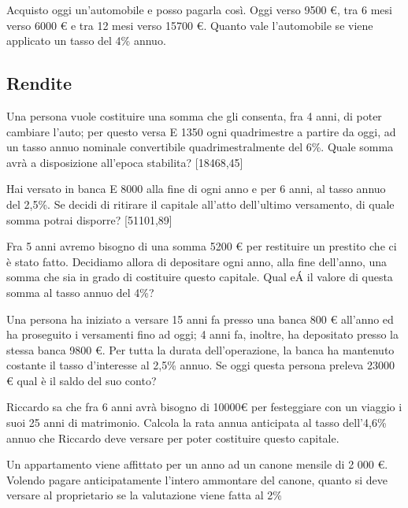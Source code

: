 \begin{esercizio}
Acquisto oggi un'automobile e posso pagarla così. Oggi verso 9500 €, tra 6 mesi verso 6000 € e tra 12 mesi verso 15700 €. Quanto vale l'automobile se viene applicato un tasso del 4\% annuo.
\end{esercizio}


\subsection{Rendite}
\begin{esercizio}
Una persona vuole costituire una somma che gli consenta, fra 4 anni, di poter cambiare l'auto; per questo versa E 1350 ogni quadrimestre a partire da oggi, ad un tasso annuo nominale convertibile quadrimestralmente del 6\%. Quale somma avrà a disposizione all'epoca stabilita?
\hfill[18468,45]
\end{esercizio}
\begin{esercizio}
Hai versato in banca E 8000 alla fine di ogni anno e per 6 anni, al tasso annuo del 2,5\%. Se decidi di
ritirare il capitale all'atto dell'ultimo versamento, di quale somma potrai disporre?
\hfill[51101,89]
\end{esercizio}
\begin{esercizio}
Fra 5 anni avremo bisogno di una somma 5200 € per restituire un prestito che ci è stato fatto. Decidiamo
allora di depositare ogni anno, alla fine dell'anno, una somma che sia in grado di costituire questo capitale. Qual eÁ il valore di questa somma al tasso annuo del 4\%?
\end{esercizio}
\begin{esercizio}
Una persona ha iniziato a versare 15 anni fa presso una banca 800 € all'anno ed ha proseguito i versamenti fino ad oggi; 4 anni fa, inoltre, ha depositato presso la stessa banca 9800 €. Per tutta la durata
dell'operazione, la banca ha mantenuto costante il tasso d'interesse al 2,5\% annuo. Se oggi questa persona preleva 23000 € qual è il saldo del suo conto?

\end{esercizio}

\begin{esercizio}
Riccardo sa che fra 6 anni avrà bisogno di 10000€ per festeggiare con un viaggio i suoi 25 anni di matrimonio. Calcola la rata annua anticipata al tasso dell'4,6\% annuo che Riccardo deve versare per poter costituire questo capitale.
\end{esercizio}
\begin{esercizio}
Un appartamento viene affittato per un anno ad un canone mensile di 2 000 €. Volendo pagare anticipatamente l'intero ammontare del canone, quanto si deve versare al proprietario se la valutazione viene fatta al 2\%
\end{esercizio}


